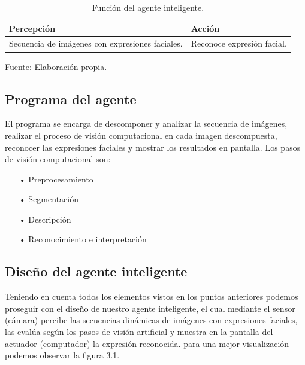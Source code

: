 \begin{table}[ht!]
\centering
\caption{Función del agente inteligente.} \vskip 0.1cm
\begin{tabular}{|p{4cm} |p{3.5cm}|}  \hline 
\bf Percepción & \bf Acción \\ \hline 
Secuencia de imágenes con expresiones faciales. & Reconoce expresión facial. \\ \hline
\end{tabular} 
\begin{center}
{\small{Fuente: Elaboración propia.}}
\end{center}
\end{table}

\subsection{Programa del agente}
El programa se encarga de descomponer y analizar la secuencia de imágenes, realizar el proceso de visión computacional en cada imagen descompuesta, reconocer las expresiones faciales y mostrar los resultados en pantalla. Los pasos de visión computacional son:

\begin{itemize}
\item[•] Preprocesamiento
\item[•] Segmentación
\item[•] Descripción
\item[•] Reconocimiento e interpretación
\end{itemize}

\subsection{Diseño del agente inteligente}
Teniendo en cuenta todos los elementos vistos en los puntos anteriores podemos proseguir con el diseño de nuestro agente inteligente, el cual mediante el sensor (cámara) percibe las secuencias dinámicas de imágenes con expresiones faciales, las evalúa según los pasos de visión artificial y muestra en la pantalla del actuador (computador) la expresión reconocida. para una mejor visualización podemos observar la figura 3.1.

